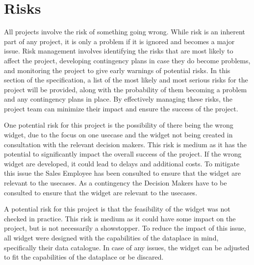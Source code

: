 \chapter{Risks}

All projects involve the risk of something going wrong. While risk is an inherent part of any project, it is only a problem if it is ignored and becomes a major issue. Risk management involves identifying the risks that are most likely to affect the project, developing contingency plans in case they do become problems, and monitoring the project to give early warnings of potential risks. In this section of the specification, a list of the most likely and most serious risks for the project will be provided, along with the probability of them becoming a problem and any contingency plans in place. By effectively managing these risks, the project team can minimize their impact and ensure the success of the project.

One potential risk for this project is the possibility of there being the wrong \gls{widget}, due to the focus on one \gls{usecase} and the \gls{widget} not being created in consultation with the relevant decision makers. This risk is medium as it has the potential to significantly impact the overall success of the project. If the wrong \gls{widget} are developed, it could lead to delays and additional costs. To mitigate this issue the Sales Employee has been consulted to ensure that the \gls{widget} are relevant to the \glspl{usecase}. As a contingency the Decision Makers have to be consulted to ensure that the \gls{widget} are relevant to the \glspl{usecase}.

A potential risk for this project is that the feasibility of the \gls{widget} was not checked in practice. This risk is medium as it could have some impact on the project, but is not necessarily a showstopper. To reduce the impact of this issue, all \gls{widget} were designed with the capabilities of the \gls{dataplace} in mind, specifically their data catalogue. In case of any issues, the \gls{widget} can be adjusted to fit the capabilities of the \gls{dataplace} or be discared.


